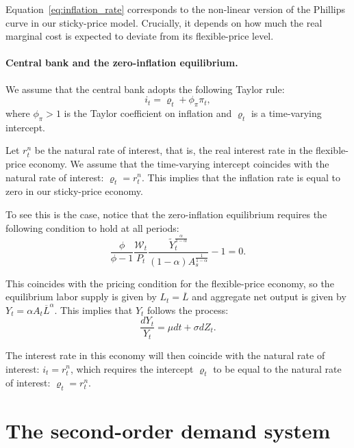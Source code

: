 Equation~\eqref{eq:inflation_rate} corresponds to the non-linear version of the Phillips curve in our sticky-price model. 
Crucially, it depends on how much the real marginal cost is expected to deviate from its flexible-price level.


\paragraph{Central bank and the zero-inflation equilibrium.} We assume that the central bank adopts the following Taylor rule:
\begin{equation}
    i_t = \varrho_t + \phi_\pi \pi_t,
\end{equation}
where $\phi_\pi > 1$ is the Taylor coefficient on inflation and $\varrho_t$ is a time-varying intercept. 

Let $r_t^n$ be the natural rate of interest, that is, the real interest rate in the flexible-price economy.
We assume that the time-varying intercept coincides with the natural rate of interest:  $\varrho_t = r_t^n$.
This implies that the inflation rate is equal to zero in our sticky-price economy.

To see this is the case, notice that the zero-inflation equilibrium requires the following condition to hold at all periods:
\begin{equation}
    \frac{\phi}{\phi-1} \frac{\mathcal{W}_{t}}{P_{t}} \frac{\tilde{Y}_{t}^{\frac{\alpha}{1-\alpha}}}{(1-\alpha) A_s^{\frac{1}{1-\alpha}}}-1 = 0.
\end{equation}

This coincides with the pricing condition for the flexible-price economy, so the equilibrium labor supply is given by $L_t = \overline{L}$ and aggregate net output is given by $Y_t = \alpha A_t \overline{L}^\alpha$.
This implies that $Y_t$ follows the process:
\begin{equation}
    \frac{dY_t}{Y_t} = \mu dt + \sigma dZ_t.
\end{equation}

The interest rate in this economy will then coincide with the natural rate of interest: $i_t = r_t^n$, which requires the intercept $\varrho_t$ to be equal to the natural rate of interest: $\varrho_t = r_t^n$.




\section{The second-order demand system}

